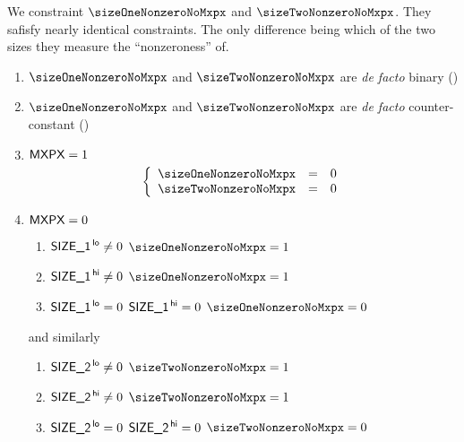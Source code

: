 We constraint $\sizeOneNonzeroNoMxpx$ and $\sizeTwoNonzeroNoMxpx$.
They safisfy nearly identical constraints.
The only difference being which of the two sizes they measure the ``nonzeroness'' of.
\begin{enumerate}
    \item $\sizeOneNonzeroNoMxpx$ and $\sizeTwoNonzeroNoMxpx$ are \emph{de facto} binary \quad (\trash)
    \item $\sizeOneNonzeroNoMxpx$ and $\sizeTwoNonzeroNoMxpx$ are \emph{de facto} counter-constant \quad (\trash)
    \item \If $\textsf{MXPX} = 1$ \Then
        \[
            \left\{ \begin{array}{lcl}
                \sizeOneNonzeroNoMxpx & = & 0 \\
                \sizeTwoNonzeroNoMxpx & = & 0 \\
            \end{array} \right.
        \]
    \item \If $\textsf{MXPX} = 0$ \Then
        \begin{enumerate}
            \item  \If $\textsf{SIZE}\textsf{\_1}^{\mathsf{\,lo}} \neq 0$ \Then $\sizeOneNonzeroNoMxpx = 1$
            \item  \If $\textsf{SIZE}\textsf{\_1}^{\mathsf{\,hi}} \neq 0$ \Then $\sizeOneNonzeroNoMxpx = 1$
            \item  \If $\textsf{SIZE}\textsf{\_1}^{\mathsf{\,lo}} =    0$ \et $\textsf{SIZE}\textsf{\_1}^{\mathsf{\,hi}} = 0$ \Then $\sizeOneNonzeroNoMxpx = 0$
        \end{enumerate}
        and similarly
        \begin{enumerate}
            \item  \If $\textsf{SIZE}\textsf{\_2}^{\mathsf{\,lo}} \neq 0$ \Then $\sizeTwoNonzeroNoMxpx = 1$
            \item  \If $\textsf{SIZE}\textsf{\_2}^{\mathsf{\,hi}} \neq 0$ \Then $\sizeTwoNonzeroNoMxpx = 1$
            \item  \If $\textsf{SIZE}\textsf{\_2}^{\mathsf{\,lo}} =    0$ \et $\textsf{SIZE}\textsf{\_2}^{\mathsf{\,hi}} = 0$ \Then $\sizeTwoNonzeroNoMxpx = 0$
        \end{enumerate}
\end{enumerate}
